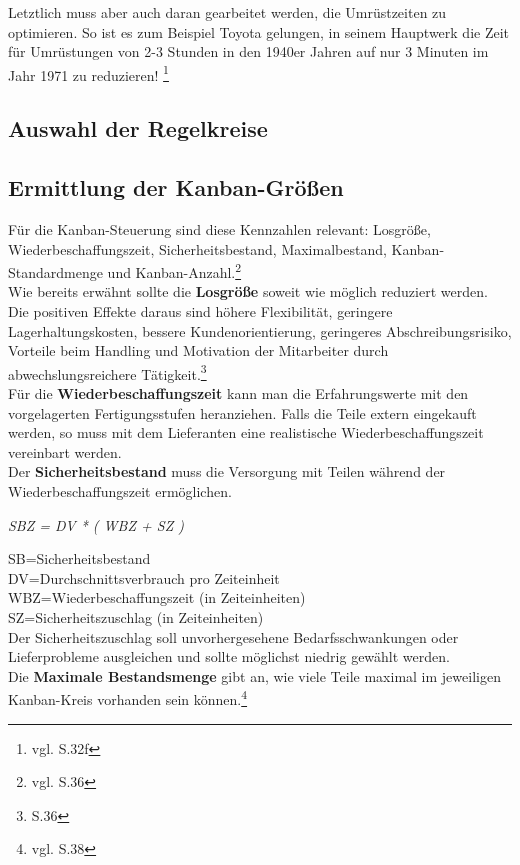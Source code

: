 Letztlich muss aber auch daran gearbeitet werden, die Umrüstzeiten zu optimieren.
So ist es zum Beispiel Toyota gelungen, in seinem Hauptwerk die Zeit für Umrüstungen von 
2-3 Stunden in den 1940er Jahren auf nur 3 Minuten im Jahr 1971 zu reduzieren! \footnote{vgl. \cite{Ohno2013TPS} S.32f}

\subsection{Auswahl der Regelkreise}
\subsection{Ermittlung der Kanban-Größen}
Für die Kanban-Steuerung sind diese Kennzahlen relevant: Losgröße, Wiederbeschaffungszeit, 
Sicherheitsbestand, Maximalbestand, Kanban-Standardmenge und Kanban-Anzahl.\footnote{vgl. \cite{Geiger2011Kanban} S.36}\\

Wie bereits erwähnt sollte die \textbf{Losgröße} soweit wie möglich reduziert werden. Die positiven Effekte daraus sind  
höhere Flexibilität, geringere Lagerhaltungskosten, bessere Kundenorientierung, 
geringeres Abschreibungsrisiko, Vorteile beim Handling und Motivation der Mitarbeiter durch 
abwechslungsreichere Tätigkeit.\footnote{\cite{Geiger2011Kanban} S.36}\\

Für die \textbf{Wiederbeschaffungszeit} kann man die Erfahrungswerte mit den vorgelagerten Fertigungsstufen heranziehen.
Falls die Teile extern eingekauft werden, so muss mit dem Lieferanten eine realistische Wiederbeschaffungszeit vereinbart werden.\\

Der \textbf{Sicherheitsbestand} muss die Versorgung mit Teilen während der Wiederbeschaffungszeit ermöglichen.\\
\centerline{\textit{SBZ = DV * ( WBZ + SZ )}}
SB=Sicherheitsbestand\\
DV=Durchschnittsverbrauch pro Zeiteinheit\\
WBZ=Wiederbeschaffungszeit (in Zeiteinheiten)\\
SZ=Sicherheitszuschlag (in Zeiteinheiten)\\
Der Sicherheitszuschlag soll unvorhergesehene Bedarfsschwankungen oder Lieferprobleme
ausgleichen und sollte möglichst niedrig gewählt werden.\\

Die \textbf{Maximale Bestandsmenge} gibt an, wie viele Teile maximal im jeweiligen Kanban-Kreis vorhanden sein können.\footnote{vgl. \cite{Geiger2011Kanban} S.38}

